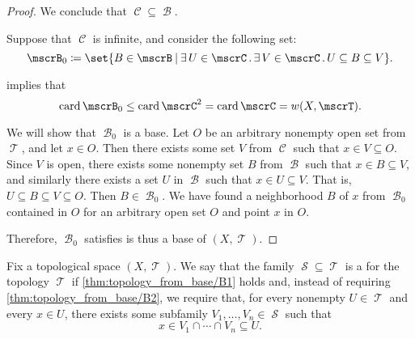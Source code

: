 \begin{proof}
  We conclude that \( \mscrC \subseteq \mscrB \).

   Suppose that \( \mscrC \) is infinite, and consider the following set:
  \begin{equation*}
    \mscrB_0 \coloneqq \set{ B \in \mscrB \given \qexists {U \in \mscrC} \qexists {V \in \mscrC} U \subseteq B \subseteq V }.
  \end{equation*}

   implies that
  \begin{equation*}
    \card\mscrB_0 \leq \card \mscrC^2 = \card \mscrC = w(X, \mscrT).
  \end{equation*}

  We will show that \( \mscrB_0 \) is a base. Let \( O \) be an arbitrary nonempty open set from \( \mscrT \), and let \( x \in O \). Then there exists some set \( V \) from \( \mscrC \) such that \( x \in V \subseteq O \). Since \( V \) is open, there exists some nonempty set \( B \) from \( \mscrB \) such that \( x \in B \subseteq V \), and similarly there exists a set \( U \) in \( \mscrB \) such that \( x \in U \subseteq V \). That is, \( U \subseteq B \subseteq V \subseteq O \). Then \( B \in \mscrB_0 \). We have found a neighborhood \( B \) of \( x \) from \( \mscrB_0 \) contained in \( O \) for an arbitrary open set \( O \) and point \( x \) in \( O \).

  Therefore, \( \mscrB_0 \) satisfies  is thus a base of \( (X, \mscrT) \).
\end{proof}

\begin{definition}\label{def:topological_subbase}
  Fix a topological space \( (X, \mscrT) \). We say that the family \( \mscrS \subseteq \mscrT \) is a  for the topology \( \mscrT \) if \ref{thm:topology_from_base/B1} holds and, instead of requiring \ref{thm:topology_from_base/B2}, we require that, for every nonempty \( U \in \mscrT \) and every \( x \in U \), there exists some subfamily \( V_1, \ldots, V_n \in \mscrS \) such that
  \begin{equation}\label{eq:def:topological_subbase}
    x \in V_1 \cap \cdots \cap V_n \subseteq U.
  \end{equation}
\end{definition}

